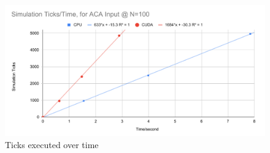 \begin{figure}
    \centering
    \includegraphics[width=\linewidth]{Ch62Results/figures/temp_ticks_vs_time_aca.pdf}
    \caption{Ticks executed over time}
    \label{fig:results:ticks_vs_time}
\end{figure}